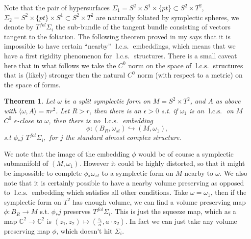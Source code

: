 \documentclass{amsart}
\numberwithin{equation}{section}
\newtheorem{theorem}{Theorem}
\theoremstyle{definition}
\theoremstyle{remark}
\DeclareMathOperator{\lcs}{l.c.s.}
\DeclareMathOperator{\lcsm}{l.c.s.m.}
\begin{document}
Note that the pair of hypersurfaces $\Sigma _{1} =S ^{2} \times S ^{1} \times \{pt \} \subset S ^{2} \times T ^{2}   $, $\Sigma _{2} =S ^{2} \times  \{pt \} \times S ^{1} \subset S ^{2} \times T ^{2}   $ are naturally foliated by symplectic spheres, we denote by $T ^{fol}  \Sigma _{i} $ the sub-bundle of the tangent bundle consisting of vectors tangent to the foliation. The following theorem proved in my \cite{citeSavelyevConformalSymplectic} says that it is impossible to have  certain ``nearby'' $\lcs$ embeddings, which means that we have a first rigidity phenomenon for $\lcs$ structures.
There is a small caveat here that in what follows we take the $C ^{0} $ norm on the space of $\lcs$ structures that is (likely) stronger then the natural $C ^{0} $ norm (with respect to a metric) on the space of forms.
\begin{theorem} \label{cor:nonsqueezing} Let $\omega$ be a split symplectic form on $M =S ^{2} \times T ^{2}  $,  and $A$ as above with $ \langle \omega, A\rangle = \pi r ^{2} $. Let $R>r$, then there is an $\epsilon>0$ s.t. if $\omega _{1} $ is an $\lcs$ on $M$ $C ^{0} $ $\epsilon$-close to $\omega$, then
   there is no $\lcs$ embedding $$\phi: (B _{R}, \omega _{st})  \hookrightarrow (M, \omega _{1}), $$  s.t 
   $\phi _{*} j$    $T ^{fol} \Sigma _{i},$ for $j$ the standard almost complex structure.
   \end{theorem}
We note that the image of the embedding $\phi$ would be of course a symplectic submanifold of  $(M, \omega _{1} )$. However it could be highly distorted, so that it might be impossible to complete $\phi _{*} \omega _{st}  $ to a symplectic form on $M$ nearby to  $\omega$.
We also note that it is certainly possible to have a nearby volume preserving as opposed to $\lcs$ embedding which satisfies all other conditions.
Take $\omega = \omega _{1}  $, then if the symplectic form on $T ^{2} $ has enough volume, we can find a volume preserving map $\phi: B _{R} \to M $ s.t. $\phi _{*} j$ preserves $T ^{fol} \Sigma _{i} $. 
This is just the squeeze map, which as a map $\mathbb{C} ^{2} \to \mathbb{C}^{2}  $ is $(z_1, z _{2} ) \mapsto (\frac{z _{1} }{a}, a \cdot {z _{2}}) $.
In fact we can just take any volume preserving map $\phi$, which doesn't hit $\Sigma _{i} $.
\end{document}
